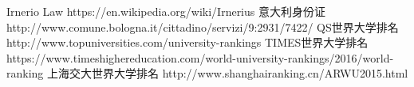 \begin{thebibliography}{90}             %
\rhead[\fancyplain{}{\bfseries \leftmark}]{\fancyplain{}{\bfseries
\thepage}}
Irnerio Law https://en.wikipedia.org/wiki/Irnerius
意大利身份证 http://www.comune.bologna.it/cittadino/servizi/9:2931/7422/
QS世界大学排名 http://www.topuniversities.com/university-rankings
TIMES世界大学排名 https://www.timeshighereducation.com/world-university-rankings/2016/world-ranking
上海交大世界大学排名 http://www.shanghairanking.cn/ARWU2015.html
\end{thebibliography}
